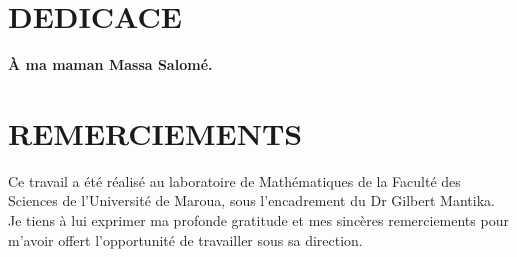 \documentclass[a4paper, 14pt]{report}
\newcommand{\applyfontsize}{%
	\fontsize{12}{12}\selectfont
}
\begin{document}
	\newpage
	\begin{onehalfspace} %
		\lhead{}
		\rhead{}
		\chead{}
		
		
		\chapter*{DEDICACE}
		
		\begin{center}
			\textbf{\textbf{ \LARGE À ma maman Massa Salomé.}}
			\vspace{1cm} %
		\end{center}
		
		\chapter*{REMERCIEMENTS}
		{
			\applyfontsize %
			
			Ce travail a été réalisé au laboratoire de Mathématiques de la Faculté des Sciences de l’Université de Maroua, sous l’encadrement du Dr Gilbert Mantika. Je tiens à lui exprimer ma profonde gratitude et mes sincères remerciements pour m’avoir offert l’opportunité de travailler sous sa direction.
			
}
\end{onehalfspace}
\end{document}
